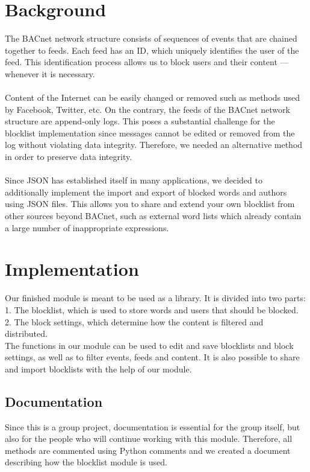 \documentclass[12pt]{article}
\begin{document}
\section{Background}
The BACnet network structure consists of sequences of events that are chained together to feeds. 
Each feed has an ID, which uniquely identifies the user of the feed. 
This identification process allows us to block users and their content --- whenever it is necessary. \\
\\
Content of the Internet can be easily changed or removed such as methods used by Facebook, Twitter, etc. 
On the contrary, the feeds of the BACnet network structure are append-only logs.
This poses a substantial challenge for the blocklist implementation since messages cannot be edited or removed from the log without violating data integrity. 
Therefore, we needed an alternative method in order to preserve data integrity.\\
\\
Since JSON has established itself in many applications, we decided to additionally implement the import and export of blocked words and authors using JSON files. 
This allows you to share and extend your own blocklist from other sources beyond BACnet, such as external word lists which already contain a large number of inappropriate expressions.

\section{Implementation}
Our finished module is meant to be used as a library. It is divided into two parts: \\
1. The blocklist, which is used to store words and users that should be blocked. \\
2. The block settings, which determine how the content is filtered and distributed. \\
The functions in our module can be used to edit and save blocklists and block settings, as well as to filter events, feeds and content. It is also possible to share and import blocklists with the help of our module.

\subsection{Documentation}
Since this is a group project, documentation is essential for the group itself, but also for the people who will continue working with this module. 
Therefore, all methods are commented using Python comments and we created a document describing how the blocklist module is used.
\end{document}
